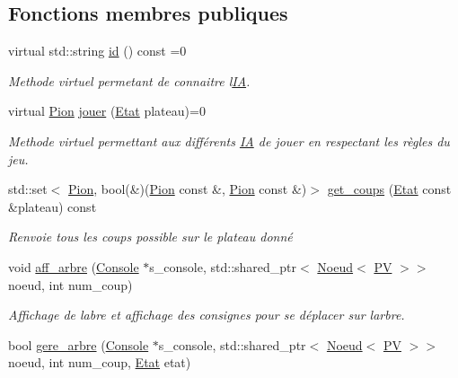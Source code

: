 \subsection*{Fonctions membres publiques}
\begin{DoxyCompactItemize}
\item 
virtual std\+::string \hyperlink{classIA_a766f10d2cd5450868523e2fa184fdf93}{id} () const =0\hypertarget{classIA_a766f10d2cd5450868523e2fa184fdf93}{}\label{classIA_a766f10d2cd5450868523e2fa184fdf93}

\begin{DoxyCompactList}\small\item\em Methode virtuel permetant de connaitre l\textquotesingle{}\hyperlink{classIA}{IA}. \end{DoxyCompactList}\item 
virtual \hyperlink{structPion}{Pion} \hyperlink{classIA_a3f40133e71c6bbe7fe7c72b4792dccb4}{jouer} (\hyperlink{structEtat}{Etat} plateau)=0\hypertarget{classIA_a3f40133e71c6bbe7fe7c72b4792dccb4}{}\label{classIA_a3f40133e71c6bbe7fe7c72b4792dccb4}

\begin{DoxyCompactList}\small\item\em Methode virtuel permettant aux différents \hyperlink{classIA}{IA} de jouer en respectant les règles du jeu. \end{DoxyCompactList}\item 
std\+::set$<$ \hyperlink{structPion}{Pion}, bool(\&)(\hyperlink{structPion}{Pion} const \&, \hyperlink{structPion}{Pion} const \&)$>$ \hyperlink{classIA_a6a1a014ffa6b3dbf6c1f401ecfa55148}{get\+\_\+coups} (\hyperlink{structEtat}{Etat} const \&plateau) const \hypertarget{classIA_a6a1a014ffa6b3dbf6c1f401ecfa55148}{}\label{classIA_a6a1a014ffa6b3dbf6c1f401ecfa55148}

\begin{DoxyCompactList}\small\item\em Renvoie tous les coups possible sur le plateau donné \end{DoxyCompactList}\item 
void \hyperlink{classIA_aca13a5971e87f358cd9e70188448b698}{aff\+\_\+arbre} (\hyperlink{classConsole}{Console} $\ast$s\+\_\+console, std\+::shared\+\_\+ptr$<$ \hyperlink{classNoeud}{Noeud}$<$ \hyperlink{structIA_1_1PV}{PV} $>$$>$ noeud, int num\+\_\+coup)\hypertarget{classIA_aca13a5971e87f358cd9e70188448b698}{}\label{classIA_aca13a5971e87f358cd9e70188448b698}

\begin{DoxyCompactList}\small\item\em Affichage de l\textquotesingle{}abre et affichage des consignes pour se déplacer sur l\textquotesingle{}arbre. \end{DoxyCompactList}\item 
bool \hyperlink{classIA_a51b5eba7eb3cb3fba5784d4688353018}{gere\+\_\+arbre} (\hyperlink{classConsole}{Console} $\ast$s\+\_\+console, std\+::shared\+\_\+ptr$<$ \hyperlink{classNoeud}{Noeud}$<$ \hyperlink{structIA_1_1PV}{PV} $>$$>$ noeud, int num\+\_\+coup, \hyperlink{structEtat}{Etat} etat)\hypertarget{classIA_a51b5eba7eb3cb3fba5784d4688353018}{}\label{classIA_a51b5eba7eb3cb3fba5784d4688353018}


\end{DoxyCompactItemize}
